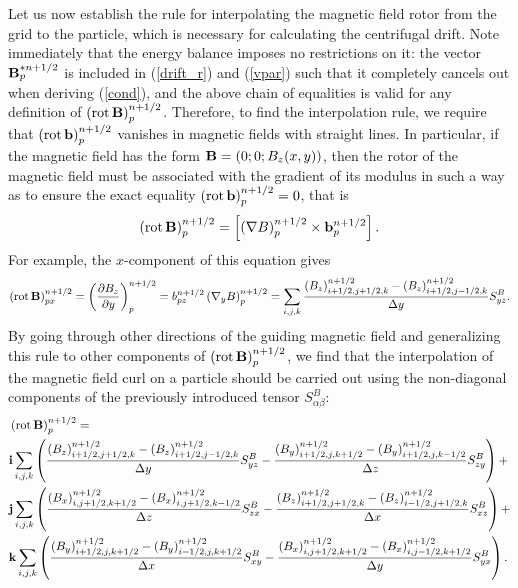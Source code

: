 \documentclass[final,3p]{elsarticle}
\newcommand{\rot}{\mbox{\rm{rot\,}}}
\begin{document}
Let us now establish the rule for interpolating the magnetic field rotor from the grid to the particle, which is necessary for calculating the centrifugal drift. Note immediately that the energy balance imposes no restrictions on it: the vector ${\bf B}_p^{\ast n+1/2}$ is included in (\ref{drift_r}) and (\ref{vpar}) such that it completely cancels out when deriving (\ref{cond}), and the above chain of equalities is valid for any definition of $\left(\rot {\bf B}\right)_{p}^{n+1/2}$. Therefore, to find the interpolation rule, we require that $\left(\rot {\bf b}\right)_p^{n+1/2}$ vanishes in magnetic fields with straight lines. In particular, if the magnetic field has the form ${\bf B}=\left(0; 0; B_z(x,y)\right)$, then the rotor of the magnetic field must be associated with the gradient of its modulus in such a way as to ensure the exact equality $\left(\rot {\bf b}\right)_p^{n+1/2}=0$, that is
\begin{equation}
	\left(\rot {\bf B}\right)_{p}^{n+1/2}=\left[\left(\nabla B\right)_p^{n+1/2}\times {\bf b}_p^{n+1/2}\right].
\end{equation}
For example, the $x$-component of this equation gives
\begin{equation}
	\left(\rot {\bf B}\right)_{px}^{n+1/2}=\left(\frac{\partial B_z}{\partial y}\right)_p^{n+1/2}= b_{pz}^{n+1/2} \left(\nabla_y B\right)_p^{n+1/2}=\sum\limits_{i,j,k} \frac{(B_z)_{i+1/2,j+1/2,k}^{n+1/2}-(B_z)_{i+1/2,j-1/2,k}^{n+1/2}}{\Delta y} S_{yz}^B.
\end{equation}
By going through other directions of the guiding magnetic field and generalizing this rule to other components of $\left(\rot {\bf B}\right)_{p}^{n+1/2}$, we find that the interpolation of the magnetic field curl on a particle should be carried out using the non-diagonal components of the previously introduced tensor $S_{\alpha\beta}^B$:
\begin{align}
	&\left(\rot {\bf B}\right)_{p}^{n+1/2}=\nonumber \\
	&{\bf i} \sum\limits_{i,j,k} \left(\frac{(B_z)_{i+1/2,j+1/2,k}^{n+1/2}-(B_z)_{i+1/2,j-1/2,k}^{n+1/2}}{\Delta y} S_{yz}^B-\frac{(B_y)_{i+1/2,j,k+1/2}^{n+1/2}-(B_y)_{i+1/2,j,k-1/2}^{n+1/2}}{\Delta z} S_{zy}^B\right)+\nonumber \\
	&{\bf j} \sum\limits_{i,j,k} \left(\frac{(B_x)_{i,j+1/2,k+1/2}^{n+1/2}-(B_x)_{i,j+1/2,k-1/2}^{n+1/2}}{\Delta z} S_{zx}^B-\frac{(B_z)_{i+1/2,j+1/2,k}^{n+1/2}-(B_z)_{i-1/2,j+1/2,k}^{n+1/2}}{\Delta x} S_{xz}^B\right)+\nonumber \\
	&{\bf k} \sum\limits_{i,j,k} \left(\frac{(B_y)_{i+1/2,j,k+1/2}^{n+1/2}-(B_y)_{i-1/2,j,k+1/2}^{n+1/2}}{\Delta x} S_{xy}^B-\frac{(B_x)_{i,j+1/2,k+1/2}^{n+1/2}-(B_x)_{i,j-1/2,k+1/2}^{n+1/2}}{\Delta y} S_{yx}^B\right).\label{rotB}
\end{align}
\end{document}
